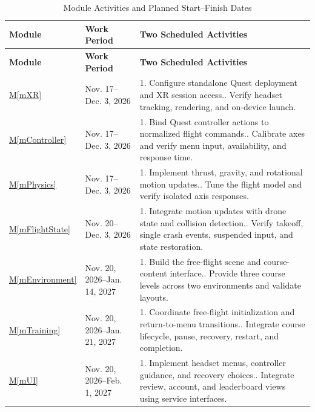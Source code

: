 \documentclass[12pt, titlepage]{article}
\newcommand{\mref}[1]{\hyperref[#1]{M\ref*{#1}}}
\begin{document}
\begingroup
\small
\renewcommand{\arraystretch}{1.2}
\begin{longtable}{p{} p{} p{}}
\caption{Module Activities and Planned Start--Finish Dates}
\label{TblModuleSchedule}\\
\toprule
\textbf{Module} & \textbf{Work Period} & \textbf{Two Scheduled Activities} \\
\midrule
\endfirsthead
\toprule
\textbf{Module} & \textbf{Work Period} & \textbf{Two Scheduled Activities} \\
\midrule
\endhead
\bottomrule
\endfoot
\mref{mXR} & Nov. 17--Dec. 3, 2026
& 1. Configure standalone Quest deployment and XR session access.\newline
  2. Verify headset tracking, rendering, and on-device launch. \\
\addlinespace
\mref{mController} & Nov. 17--Dec. 3, 2026
& 1. Bind Quest controller actions to normalized flight commands.\newline
  2. Calibrate axes and verify menu input, availability, and response time. \\
\addlinespace
\mref{mPhysics} & Nov. 17--Dec. 3, 2026
& 1. Implement thrust, gravity, and rotational motion updates.\newline
  2. Tune the flight model and verify isolated axis responses. \\
\addlinespace
\mref{mFlightState} & Nov. 20--Dec. 3, 2026
& 1. Integrate motion updates with drone state and collision detection.\newline
  2. Verify takeoff, single crash events, suspended input, and state
  restoration. \\
\addlinespace
\mref{mEnvironment} & Nov. 20, 2026--Jan. 14, 2027
& 1. Build the free-flight scene and course-content interface.\newline
  2. Provide three course levels across two environments and validate layouts.
  \\
\addlinespace
\mref{mTraining} & Nov. 20, 2026--Jan. 21, 2027
& 1. Coordinate free-flight initialization and return-to-menu
transitions.\newline
  2. Integrate course lifecycle, pause, recovery, restart, and completion. \\
\addlinespace
\mref{mUI} & Nov. 20, 2026--Feb. 1, 2027
& 1. Implement headset menus, controller guidance, and recovery choices.\newline
  2. Integrate review, account, and leaderboard views using service interfaces.
  \\

\end{longtable}
\end{document}
